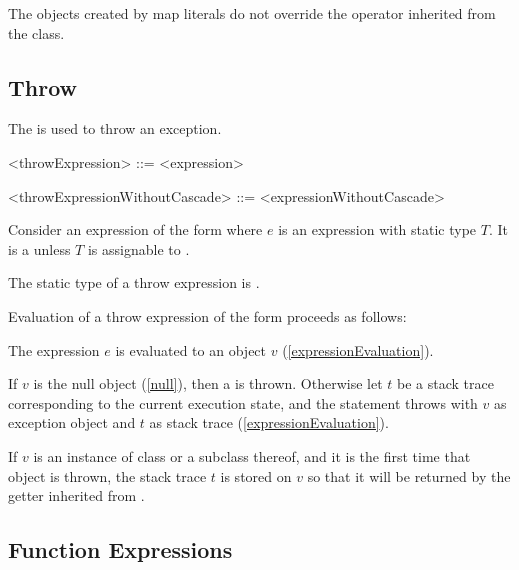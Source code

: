 \documentclass[makeidx]{article}
\begin{document}
{\LMHash{}%
The objects created by map literals do not override
the \lit{==} operator inherited from the  class.


\subsection{Throw}

\LMHash{}%
The  is used to throw an exception.

\begin{grammar}
<throwExpression> ::= \THROW{} <expression>

<throwExpressionWithoutCascade> ::= \THROW{} <expressionWithoutCascade>
\end{grammar}

\LMHash{}%
Consider an expression of the form 
where $e$ is an expression with static type $T$.
It is a  unless $T$ is assignable to .

\LMHash{}%
The static type of a throw expression is .

\LMHash{}%
Evaluation of a throw expression of the form 
proceeds as follows:

\LMHash{}%
The expression $e$ is evaluated to an object $v$
(\ref{expressionEvaluation}).


\LMHash{}%
If $v$ is the null object (\ref{null}), then a  is thrown.
Otherwise let $t$ be a stack trace corresponding to the current execution state,
and the \THROW{} statement throws with $v$ as exception object
and $t$ as stack trace (\ref{expressionEvaluation}).

\LMHash{}%
If $v$ is an instance of class  or a subclass thereof,
and it is the first time that  object is thrown,
the stack trace $t$ is stored on $v$ so that it will be returned
by the  getter inherited from .



\subsection{Function Expressions}

}
\end{document}
